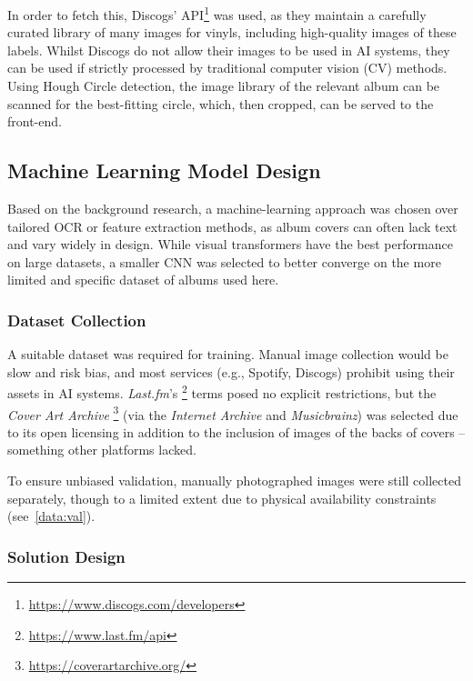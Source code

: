                 In order to fetch this, Discogs' API\footnote{\url{https://www.discogs.com/developers}} was used, as they maintain a carefully curated library of many images for vinyls, including high-quality images of these labels. Whilst Discogs do not allow their images to be used in AI systems, they can be used if strictly processed by traditional computer vision (CV) methods. Using Hough Circle detection, the image library of the relevant album can be scanned for the best-fitting circle, which, then cropped, can be served to the front-end.
          
        \subsection{Machine Learning Model Design} \label{sec:mlDesign}
    
            Based on the background research, a machine-learning approach was chosen over tailored OCR or feature extraction methods, as album covers can often lack text and vary widely in design. While visual transformers have the best performance on large datasets, a smaller CNN was selected to better converge on the more limited and specific dataset of albums used here.
        
            \subsubsection{Dataset Collection}
    
                A suitable dataset was required for training. Manual image collection would be slow and risk bias, and most services (e.g., Spotify, Discogs) prohibit using their assets in AI systems. \textit{Last.fm}'s \footnote{\url{https://www.last.fm/api}} terms posed no explicit restrictions, but the \textit{Cover Art Archive} \footnote{\url{https://coverartarchive.org/}} (via the \textit{Internet Archive} and \textit{Musicbrainz}) was selected due to its open licensing in addition to the inclusion of images of the backs of covers -- something other platforms lacked.
    
                To ensure unbiased validation, manually photographed images were still collected separately, though to a limited extent due to physical availability constraints (see~\ref{data:val}).
    
            \subsubsection{Solution Design}
    
